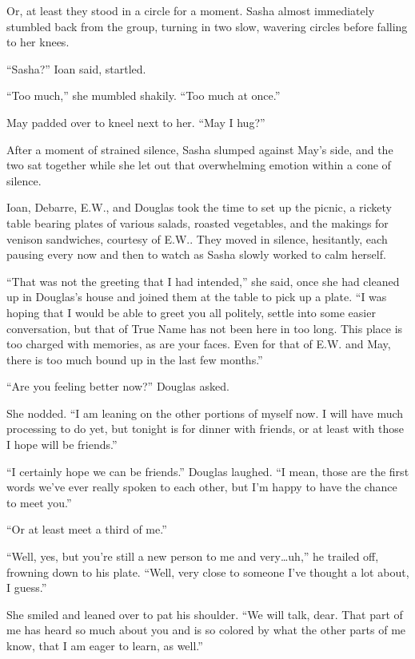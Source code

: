 Or, at least they stood in a circle for a moment. Sasha almost immediately stumbled back from the group, turning in two slow, wavering circles before falling to her knees.

``Sasha?'' Ioan said, startled.

``Too much,'' she mumbled shakily. ``Too much at once.''

May padded over to kneel next to her. ``May I hug?''

After a moment of strained silence, Sasha slumped against May's side, and the two sat together while she let out that overwhelming emotion within a cone of silence.

Ioan, Debarre, E.W., and Douglas took the time to set up the picnic, a rickety table bearing plates of various salads, roasted vegetables, and the makings for venison sandwiches, courtesy of E.W.. They moved in silence, hesitantly, each pausing every now and then to watch as Sasha slowly worked to calm herself.

``That was not the greeting that I had intended,'' she said, once she had cleaned up in Douglas's house and joined them at the table to pick up a plate. ``I was hoping that I would be able to greet you all politely, settle into some easier conversation, but that of True Name has not been here in too long. This place is too charged with memories, as are your faces. Even for that of E.W. and May, there is too much bound up in the last few months.''

``Are you feeling better now?'' Douglas asked.

She nodded. ``I am leaning on the other portions of myself now. I will have much processing to do yet, but tonight is for dinner with friends, or at least with those I hope will be friends.''

``I certainly hope we can be friends.'' Douglas laughed. ``I mean, those are the first words we've ever really spoken to each other, but I'm happy to have the chance to meet you.''

``Or at least meet a third of me.''

``Well, yes, but you're still a new person to me and very\ldots uh,'' he trailed off, frowning down to his plate. ``Well, very close to someone I've thought a lot about, I guess.''

She smiled and leaned over to pat his shoulder. ``We will talk, dear. That part of me has heard so much about you and is so colored by what the other parts of me know, that I am eager to learn, as well.''

